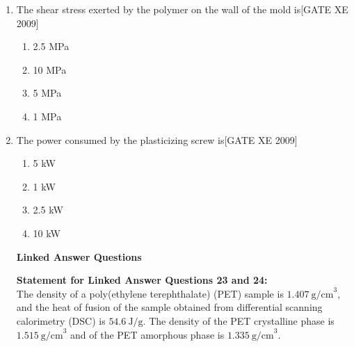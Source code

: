 \documentclass[journal,12pt,onecolumn]{IEEEtran}
\theoremstyle{remark}
\begin{document}
\begin{enumerate}[label=\textbf{Q.\arabic*.}, resume, wide=0pt, leftmargin=*]

\item The shear stress exerted by the polymer on the wall of the mold is\hfill[GATE XE 2009]
\begin{multicols}{2}
\begin{enumerate}
\item 2.5 MPa
\item 10 MPa
\item 5 MPa
\item 1 MPa
\end{enumerate}
\end{multicols}

\item The power consumed by the plasticizing screw is\hfill[GATE XE 2009]
\begin{multicols}{2}
\begin{enumerate}
\item 5 kW
\item 1 kW
\item 2.5 kW
\item 10 kW
\end{enumerate}
\end{multicols}



\vspace{1em}
\textbf{Linked Answer Questions}

\textbf{Statement for Linked Answer Questions 23 and 24:}\\
The density of a poly(ethylene terephthalate) (PET) sample is $1.407~\text{g/cm}^3$, and the heat of fusion of the sample obtained from differential scanning calorimetry (DSC) is $54.6~\text{J/g}$. The density of the PET crystalline phase is $1.515~\text{g/cm}^3$ and of the PET amorphous phase is $1.335~\text{g/cm}^3$.
\end{enumerate}
\end{document}
